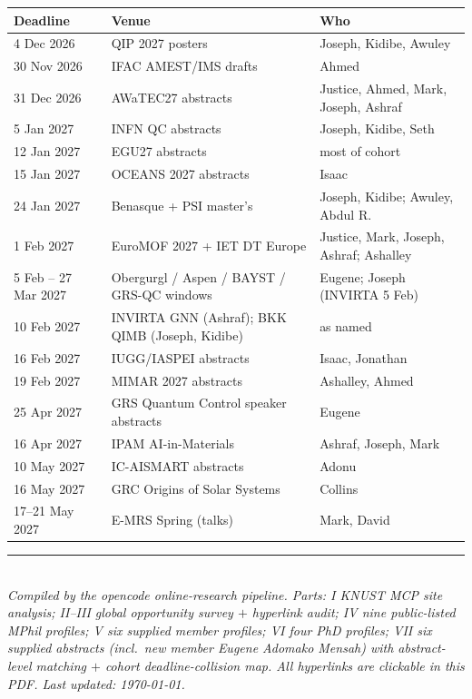 \documentclass[11pt,a4paper]{article}
\begin{document}
\begin{center}
\small
\begin{tabular}{@{}L{2.8cm}L{4.6cm}L{7.6cm}@{}}
\toprule
\textbf{Deadline} & \textbf{Venue} & \textbf{Who} \\
 Dec 2026 & QIP 2027 posters & Joseph, Kidibe, Awuley \\
30 Nov 2026 & IFAC AMEST/IMS drafts & Ahmed \\
31 Dec 2026 & AWaTEC27 abstracts & Justice, Ahmed, Mark, Joseph, Ashraf \\
5 Jan 2027 & INFN QC abstracts & Joseph, Kidibe, Seth \\
12 Jan 2027 & EGU27 abstracts & most of cohort \\
15 Jan 2027 & OCEANS 2027 abstracts & Isaac \\
24 Jan 2027 & Benasque + PSI master's & Joseph, Kidibe; Awuley, Abdul R. \\
1 Feb 2027 & EuroMOF 2027 + IET DT Europe & Justice, Mark, Joseph, Ashraf; Ashalley \\
5 Feb -- 27 Mar 2027 & Obergurgl / Aspen / BAYST / GRS-QC windows & Eugene; Joseph (INVIRTA 5 Feb) \\
10 Feb 2027 & INVIRTA GNN (Ashraf); BKK QIMB (Joseph, Kidibe) & as named \\
16 Feb 2027 & IUGG/IASPEI abstracts & Isaac, Jonathan \\
19 Feb 2027 & MIMAR 2027 abstracts & Ashalley, Ahmed \\
25 Apr 2027 & GRS Quantum Control speaker abstracts & Eugene \\
16 Apr 2027 & IPAM AI-in-Materials & Ashraf, Joseph, Mark \\
10 May 2027 & IC-AISMART abstracts & Adonu \\
16 May 2027 & GRC Origins of Solar Systems & Collins \\
17--21 May 2027 & E-MRS Spring (talks) & Mark, David \\
\bottomrule
\end{tabular}
\end{center}

\bigskip
\noindent\rule{\textwidth}{0.4pt}\\
\small\emph{Compiled by the opencode online-research pipeline. Parts: I KNUST MCP site analysis; II--III global opportunity survey $+$ hyperlink audit; IV nine public-listed MPhil profiles; V six supplied member profiles; VI four PhD profiles; VII six supplied abstracts (incl.\ new member Eugene Adomako Mensah) with abstract-level matching $+$ cohort deadline-collision map. All hyperlinks are clickable in this PDF. Last updated: \today.}
\end{document}
